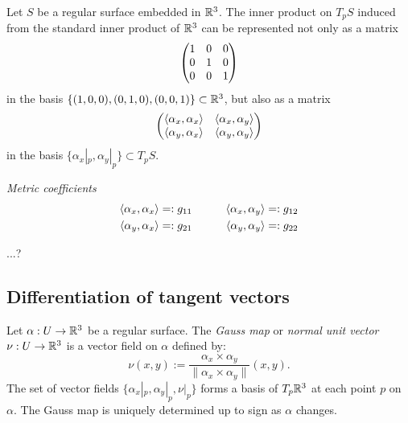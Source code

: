 \documentclass{../../large}
\begin{document}
Let $S$ be a regular surface embedded in $\mathbb{R}^3$.
The inner product on $T_pS$ induced from the standard inner product of $\mathbb{R}^3$ can be represented not only as a matrix
\[\begin{pmatrix}1&0&0\\0&1&0\\0&0&1\end{pmatrix}\]
in the basis $\{(1,0,0),(0,1,0),(0,0,1)\}\subset\mathbb{R}^3$, but also as a matrix
\[\begin{pmatrix}\langle\alpha_x,\alpha_x\rangle&\langle\alpha_x,\alpha_y\rangle\\\langle\alpha_y,\alpha_x\rangle&\langle\alpha_y,\alpha_y\rangle\end{pmatrix}\]
in the basis $\{\alpha_x|_p,\alpha_y|_p\}\subset T_pS$.

\begin{defn}
\emph{Metric coefficients}
\begin{alignat*}{2}
\langle\alpha_x,\alpha_x\rangle&=:g_{11}&\qquad
\langle\alpha_x,\alpha_y\rangle&=:g_{12}\\
\langle\alpha_y,\alpha_x\rangle&=:g_{21}&
\langle\alpha_y,\alpha_y\rangle&=:g_{22}
\end{alignat*}
\end{defn}

\begin{thm}
...?
\end{thm}




\subsection*{Differentiation of tangent vectors}

\begin{defn}
Let $\alpha:U\to\mathbb{R}^3$ be a regular surface.
The \emph{Gauss map} or \emph{normal unit vector} $\nu:U\to\mathbb{R}^3$ is a vector field on $\alpha$ defined by:
\[\nu(x,y):=\frac{\alpha_x\times \alpha_y}{\|\alpha_x\times \alpha_y\|}(x,y).\]
The set of vector fields $\{\alpha_x|_p,\alpha_y|_p,\nu|_p\}$ forms a basis of $T_p\mathbb{R}^3$ at each point $p$ on $\alpha$.
The Gauss map is uniquely determined up to sign as $\alpha$ changes.
\end{defn}
\end{document}

